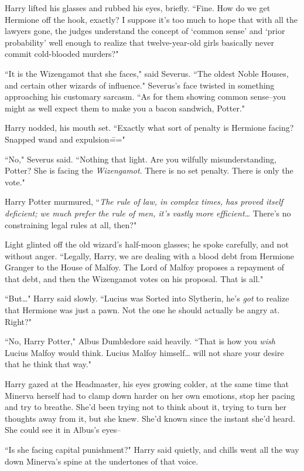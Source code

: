Harry lifted his glasses and rubbed his eyes, briefly. ``Fine. How do we get Hermione off the hook, exactly? I suppose it's too much to hope that with all the lawyers gone, the judges understand the concept of `common sense' and `prior probability' well enough to realize that twelve-year-old girls basically never commit cold-blooded murders?"

``It is the Wizengamot that she faces," said Severus. ``The oldest Noble Houses, and certain other wizards of influence." Severus's face twisted in something approaching his customary sarcasm. ``As for them showing common sense\---you might as well expect them to make you a bacon sandwich, Potter."

Harry nodded, his mouth set. ``Exactly what sort of penalty is Hermione facing? Snapped wand and expulsion\==="

``No," Severus said. ``Nothing that light. Are you wilfully misunderstanding, Potter? She is facing the \emph{Wizengamot}. There is no set penalty. There is only the vote."

Harry Potter murmured, ``\emph{The rule of law, in complex times, has proved itself deficient; we much prefer the rule of men, it's vastly more efficient{\ldots}} There's no constraining legal rules at all, then?"

Light glinted off the old wizard's half-moon glasses; he spoke carefully, and not without anger. ``Legally, Harry, we are dealing with a blood debt from Hermione Granger to the House of Malfoy. The Lord of Malfoy proposes a repayment of that debt, and then the Wizengamot votes on his proposal. That is all."

``But{\ldots}" Harry said slowly. ``Lucius was Sorted into Slytherin, he's \emph{got} to realize that Hermione was just a pawn. Not the one he should actually be angry at. Right?"

``No, Harry Potter," Albus Dumbledore said heavily. ``That is how you \emph{wish} Lucius Malfoy would think. Lucius Malfoy himself{\ldots} will not share your desire that he think that way."

Harry gazed at the Headmaster, his eyes growing colder, at the same time that Minerva herself had to clamp down harder on her own emotions, stop her pacing and try to breathe. She'd been trying not to think about it, trying to turn her thoughts away from it, but she knew. She'd known since the instant she'd heard. She could see it in Albus's eyes\---

``Is she facing capital punishment?" Harry said quietly, and chills went all the way down Minerva's spine at the undertones of that voice.

